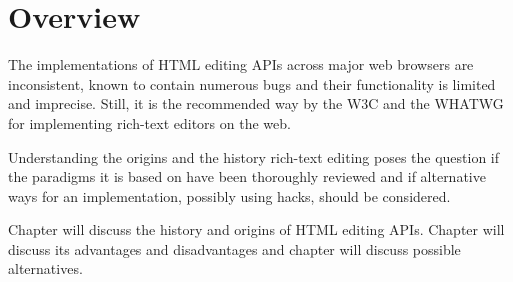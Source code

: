 \chapter{Overview}






The implementations of HTML editing APIs across major web browsers are inconsistent, known to contain numerous bugs and their functionality is limited and imprecise. Still, it is the recommended way by the W3C and the WHATWG for implementing rich-text editors on the web.

Understanding the origins and the history rich-text editing poses the question if the paradigms it is based on have been thoroughly reviewed and if alternative ways for an implementation, possibly using hacks, should be considered.

Chapter  will discuss the history and origins of HTML editing APIs. Chapter  will discuss its advantages and disadvantages and
chapter  will discuss possible alternatives.






